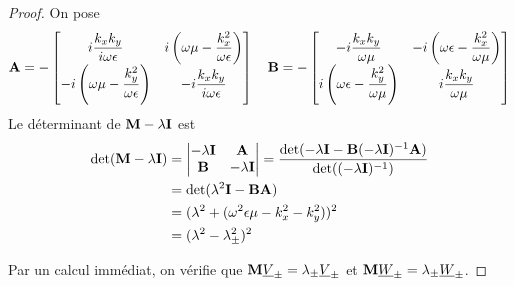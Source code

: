     \begin{proof}
        On pose 
        \begin{equation*}
            \mathbf{A} = -\begin{bmatrix}
                i\dfrac{k_xk_y}{i\omega\epsilon} & i\left(\omega\mu - \dfrac{k_x^2}{\omega\epsilon}\right) \\
                -i\left(\omega\mu - \dfrac{k_y^2}{\omega\epsilon}\right) & -i\dfrac{k_xk_y}{i\omega\epsilon} \\
            \end{bmatrix}
            \quad
            \mathbf{B} = -\begin{bmatrix}
                -i\dfrac{k_xk_y}{\omega\mu} & -i\left(\omega\epsilon - \dfrac{k_x^2}{\omega\mu}\right) \\
                i\left(\omega\epsilon - \dfrac{k_y^2}{\omega\mu}\right) & i\dfrac{k_xk_y}{\omega\mu} \\
            \end{bmatrix}
        \end{equation*}
        Le déterminant de $\mathbf{M}-\lambda \mathbf{I}$ est
        \begin{align*}
            \det(\mathbf{M}-\lambda \mathbf{I}) &= 
            \begin{vmatrix}
                -\lambda \mathbf{I} & \mathbf{A} \\
                \mathbf{B} & -\lambda \mathbf{I}
            \end{vmatrix}
                = \dfrac{\det(- \lambda \mathbf{I} - \mathbf{B}(-\lambda \mathbf{I})^{-1} \mathbf{A})}{\det((-\lambda \mathbf{I})^{-1})} \\
                &= \det(\lambda^2 \mathbf{I} - \mathbf{B}\mathbf{A}) \\
                &= (\lambda^2 + (\omega^2\epsilon\mu - k_x^2 -k_y^2))^2 \\
                &= (\lambda^2 - \lambda_\pm^2)^2
        \end{align*}


        Par un calcul immédiat, on vérifie que $\mathbf{M}\underline{V}_\pm = \lambda_\pm\underline{V}_\pm$ et $\mathbf{M}\underline{W}_\pm = \lambda_\pm\underline{W}_\pm$.
    \end{proof}

